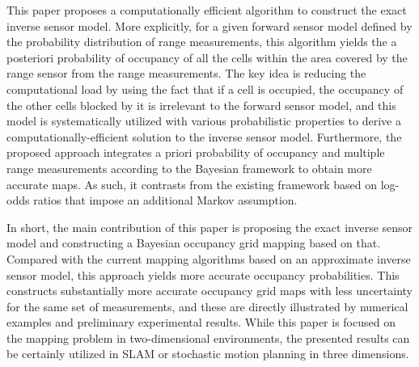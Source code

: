 \documentclass[letterpaper, 10pt, conference]{ieeeconf}
\begin{document}
This paper proposes a computationally efficient algorithm to construct the exact inverse sensor model. More explicitly, for a given forward sensor model defined by the probability distribution of range measurements, this algorithm yields the a posteriori probability of occupancy of all the cells within the area covered by the range sensor from the range measurements. The key idea is reducing the computational load by using the fact that if a cell is occupied, the occupancy of the other cells blocked by it is irrelevant to the forward sensor model, and this model is systematically utilized with various probabilistic properties to derive a computationally-efficient solution to the inverse sensor model. Furthermore, the proposed approach integrates a priori probability of occupancy and multiple range measurements according to the Bayesian framework to obtain more accurate maps. As such, it contrasts from the existing framework based on log-odds ratios that impose an additional Markov assumption. 


In short, the main contribution of this paper is proposing the exact inverse sensor model and constructing a Bayesian occupancy grid mapping based on that. Compared with the current mapping algorithms based on an approximate inverse sensor model, this approach yields more accurate occupancy probabilities. This constructs substantially more accurate occupancy grid maps with less uncertainty for the same set of measurements, and these are directly illustrated by numerical examples and preliminary experimental results. While this paper is focused on the mapping problem in two-dimensional environments, the presented results can be certainly utilized in SLAM or stochastic motion planning in three dimensions.



\end{document}
